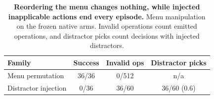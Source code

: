 \begin{table}[t]
\caption{\textbf{Reordering the menu changes nothing, while injected inapplicable actions end every episode.} Menu manipulation on the frozen native arms. Invalid operations count emitted operations, and distractor picks count decisions with injected distractors.}
\label{tab:results-menu}
\centering\footnotesize
\setlength{\tabcolsep}{4pt}
\begin{tabular}{lccc}
\toprule[0.4mm]
\rowcolor{mygray}\textbf{Family} & \textbf{Success} & \textbf{Invalid ops} & \textbf{Distractor picks} \\
\midrule
Menu permutation & 36/36 & 0/512 & n/a \\
Distractor injection & 0/36 & 36/60 & 36/60 (0.6) \\
\bottomrule
\end{tabular}
\end{table}

